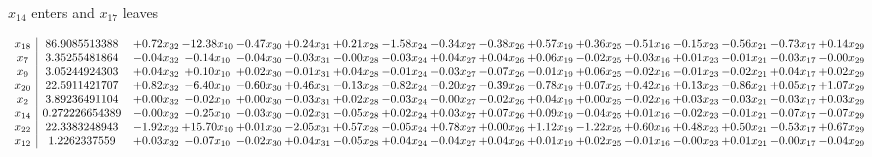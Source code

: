 \documentclass[9pt]{article}
\begin{document}
 $ x_{14} $ enters and $ x_{17} $ leaves 

 \[\begin{array}{c| c c@{\hskip 2pt} c@{\hskip 2pt} c@{\hskip 2pt} c@{\hskip 2pt} c@{\hskip 2pt} c@{\hskip 2pt} c@{\hskip 2pt} c@{\hskip 2pt} c@{\hskip 2pt} c@{\hskip 2pt} c@{\hskip 2pt} c@{\hskip 2pt} c@{\hskip 2pt} c@{\hskip 2pt} c@{\hskip 2pt} }
 x_{18}   &  86.9085513388 & +  0.72 x_{32} & -12.38 x_{10} & -0.47 x_{30} & +  0.24 x_{31} & +  0.21 x_{28} & -1.58 x_{24} & -0.34 x_{27} & -0.38 x_{26} & +  0.57 x_{19} & +  0.36 x_{25} & -0.51 x_{16} & -0.15 x_{23} & -0.56 x_{21} & -0.73 x_{17} & +  0.14 x_{29}\\
 x_{7}   &  3.35255481864 & -0.04 x_{32} & -0.14 x_{10} & -0.04 x_{30} & -0.03 x_{31} & -0.00 x_{28} & -0.03 x_{24} & +  0.04 x_{27} & +  0.04 x_{26} & +  0.06 x_{19} & -0.02 x_{25} & +  0.03 x_{16} & +  0.01 x_{23} & -0.01 x_{21} & -0.03 x_{17} & -0.00 x_{29}\\
 x_{9}   &  3.05244924303 & +  0.04 x_{32} & +  0.10 x_{10} & +  0.02 x_{30} & -0.01 x_{31} & +  0.04 x_{28} & -0.01 x_{24} & -0.03 x_{27} & -0.07 x_{26} & -0.01 x_{19} & +  0.06 x_{25} & -0.02 x_{16} & -0.01 x_{23} & -0.02 x_{21} & +  0.04 x_{17} & +  0.02 x_{29}\\
 x_{20}   &  22.5911421707 & +  0.82 x_{32} & -6.40 x_{10} & -0.60 x_{30} & +  0.46 x_{31} & -0.13 x_{28} & -0.82 x_{24} & -0.20 x_{27} & -0.39 x_{26} & -0.78 x_{19} & +  0.07 x_{25} & +  0.42 x_{16} & +  0.13 x_{23} & -0.86 x_{21} & +  0.05 x_{17} & +  1.07 x_{29}\\
 x_{2}   &  3.89236491104 & +  0.00 x_{32} & -0.02 x_{10} & +  0.00 x_{30} & -0.03 x_{31} & +  0.02 x_{28} & -0.03 x_{24} & -0.00 x_{27} & -0.02 x_{26} & +  0.04 x_{19} & +  0.00 x_{25} & -0.02 x_{16} & +  0.03 x_{23} & -0.03 x_{21} & -0.03 x_{17} & +  0.03 x_{29}\\
 x_{14}   &  0.272226654389 & -0.00 x_{32} & -0.25 x_{10} & -0.03 x_{30} & -0.02 x_{31} & -0.05 x_{28} & +  0.02 x_{24} & +  0.03 x_{27} & +  0.07 x_{26} & +  0.09 x_{19} & -0.04 x_{25} & +  0.01 x_{16} & -0.02 x_{23} & -0.01 x_{21} & -0.07 x_{17} & -0.07 x_{29}\\
 x_{22}   &  22.3383248943 & -1.92 x_{32} & + 15.70 x_{10} & +  0.01 x_{30} & -2.05 x_{31} & +  0.57 x_{28} & -0.05 x_{24} & +  0.78 x_{27} & +  0.00 x_{26} & +  1.12 x_{19} & -1.22 x_{25} & +  0.60 x_{16} & +  0.48 x_{23} & +  0.50 x_{21} & -0.53 x_{17} & +  0.67 x_{29}\\
 x_{12}   &  1.2262337559 & +  0.03 x_{32} & -0.07 x_{10} & -0.02 x_{30} & +  0.04 x_{31} & -0.05 x_{28} & +  0.04 x_{24} & -0.04 x_{27} & +  0.04 x_{26} & +  0.01 x_{19} & +  0.02 x_{25} & -0.01 x_{16} & -0.00 x_{23} & +  0.01 x_{21} & -0.00 x_{17} & -0.04 x_{29}\\

\end{array}\]
\end{document}
